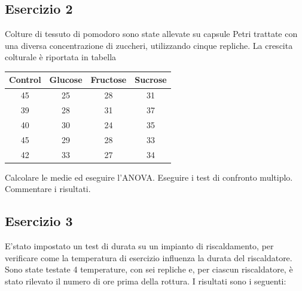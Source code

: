 \documentclass[a4paper,12pt,oneside]{book}
\begin{document}
\hypertarget{esercizio-2-5}{%
\subsection{Esercizio 2}\label{esercizio-2-5}}

Colture di tessuto di pomodoro sono state allevate su capsule Petri trattate con una diversa concentrazione di zuccheri, utilizzando cinque repliche. La crescita colturale è riportata in tabella

\begin{longtable}[]{@{}cccc@{}}
\toprule
Control & Glucose & Fructose & Sucrose \\
\midrule
\endhead
45 & 25 & 28 & 31 \\
39 & 28 & 31 & 37 \\
40 & 30 & 24 & 35 \\
45 & 29 & 28 & 33 \\
42 & 33 & 27 & 34 \\
\bottomrule
\end{longtable}

Calcolare le medie ed eseguire l'ANOVA. Eseguire i test di confronto multiplo. Commentare i risultati.

\hypertarget{esercizio-3-5}{%
\subsection{Esercizio 3}\label{esercizio-3-5}}

E'stato impostato un test di durata su un impianto di riscaldamento, per verificare come la temperatura di esercizio influenza la durata del riscaldatore. Sono state testate 4 temperature, con sei repliche e, per ciascun riscaldatore, è stato rilevato il numero di ore prima della rottura. I risultati sono i seguenti:
\end{document}
